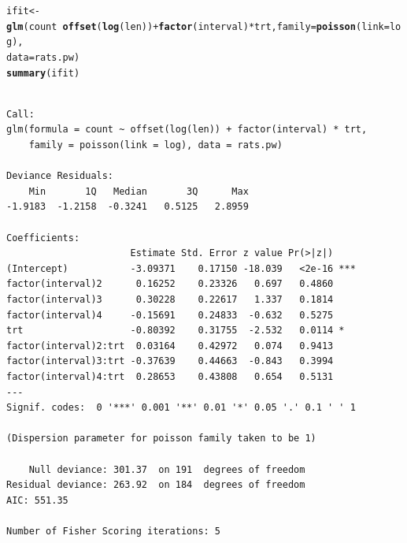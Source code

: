 \documentclass[oneside]{book}\usepackage[]{graphicx}\usepackage[svgnames]{xcolor}
\makeatletter
\newcommand{\hlopt}[1]{\textcolor[rgb]{0,0,0}{#1}}%
\newcommand{\hlstd}[1]{\textcolor[rgb]{0.345,0.345,0.345}{#1}}%
\newcommand{\hlkwb}[1]{\textcolor[rgb]{0.69,0.353,0.396}{#1}}%
\newcommand{\hlkwc}[1]{\textcolor[rgb]{0.333,0.667,0.333}{#1}}%
\newcommand{\hlkwd}[1]{\textcolor[rgb]{0.737,0.353,0.396}{\textbf{#1}}}%
\newenvironment{kframe}{%
 \def\at@end@of@kframe{}%
 \ifinner\ifhmode%
  \def\at@end@of@kframe{\end{minipage}}%
  \begin{minipage}{\columnwidth}%
 \fi\fi%
 \def\FrameCommand##1{\hskip\@totalleftmargin \hskip-\fboxsep
 \colorbox{shadecolor}{##1}\hskip-\fboxsep
     \hskip-\linewidth \hskip-\@totalleftmargin \hskip\columnwidth}%
 \MakeFramed {\advance\hsize-\width
   \@totalleftmargin\z@ \linewidth\hsize
   \@setminipage}}%
 {\par\unskip\endMakeFramed%
 \at@end@of@kframe}
\newenvironment{knitrout}{}{} %
\makeatother
\begin{document}
\begin{knitrout}
\color{fgcolor}\begin{kframe}
\begin{alltt}
\hlstd{ifit} \hlkwb{<-} \hlkwd{glm}\hlstd{(count} \hlopt{~} \hlkwd{offset}\hlstd{(}\hlkwd{log}\hlstd{(len))} \hlopt{+} \hlkwd{factor}\hlstd{(interval)} \hlopt{*} \hlstd{trt,} \hlkwc{family} \hlstd{=} \hlkwd{poisson}\hlstd{(}\hlkwc{link} \hlstd{= log),}
  \hlkwc{data} \hlstd{= rats.pw)}
\hlkwd{summary}\hlstd{(ifit)}
\end{alltt}
\begin{verbatim}

Call:
glm(formula = count ~ offset(log(len)) + factor(interval) * trt, 
    family = poisson(link = log), data = rats.pw)

Deviance Residuals: 
    Min       1Q   Median       3Q      Max  
-1.9183  -1.2158  -0.3241   0.5125   2.8959  

Coefficients:
                      Estimate Std. Error z value Pr(>|z|)    
(Intercept)           -3.09371    0.17150 -18.039   <2e-16 ***
factor(interval)2      0.16252    0.23326   0.697   0.4860    
factor(interval)3      0.30228    0.22617   1.337   0.1814    
factor(interval)4     -0.15691    0.24833  -0.632   0.5275    
trt                   -0.80392    0.31755  -2.532   0.0114 *  
factor(interval)2:trt  0.03164    0.42972   0.074   0.9413    
factor(interval)3:trt -0.37639    0.44663  -0.843   0.3994    
factor(interval)4:trt  0.28653    0.43808   0.654   0.5131    
---
Signif. codes:  0 '***' 0.001 '**' 0.01 '*' 0.05 '.' 0.1 ' ' 1

(Dispersion parameter for poisson family taken to be 1)

    Null deviance: 301.37  on 191  degrees of freedom
Residual deviance: 263.92  on 184  degrees of freedom
AIC: 551.35

Number of Fisher Scoring iterations: 5
\end{verbatim}
\end{kframe}
\end{knitrout}
\end{document}
